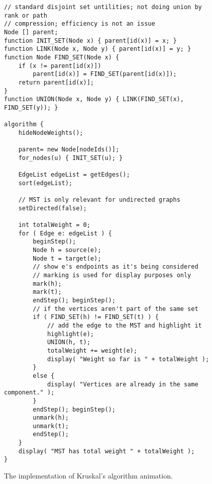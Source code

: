 \begin{figure}

{\small
\begin{verbatim}
// standard disjoint set untilities; not doing union by rank or path
// compression; efficiency is not an issue
Node [] parent;
function INIT_SET(Node x) { parent[id(x)] = x; }
function LINK(Node x, Node y) { parent[id(x)] = y; }
function Node FIND_SET(Node x) {
    if (x != parent[id(x)])
        parent[id(x)] = FIND_SET(parent[id(x)]);
    return parent[id(x)];
}
function UNION(Node x, Node y) { LINK(FIND_SET(x), FIND_SET(y)); }

algorithm {
    hideNodeWeights();

    parent= new Node[nodeIds()];
    for_nodes(u) { INIT_SET(u); }

    EdgeList edgeList = getEdges();
    sort(edgeList);

    // MST is only relevant for undirected graphs
    setDirected(false);

    int totalWeight = 0;
    for ( Edge e: edgeList ) {
        beginStep();
        Node h = source(e);
        Node t = target(e);
        // show e's endpoints as it's being considered
        // marking is used for display purposes only
        mark(h);
        mark(t);
        endStep(); beginStep();
        // if the vertices aren't part of the same set
        if ( FIND_SET(h) != FIND_SET(t) ) {
            // add the edge to the MST and highlight it
            highlight(e);
            UNION(h, t);
            totalWeight += weight(e);
            display( "Weight so far is " + totalWeight );
        }
        else {
            display( "Vertices are already in the same component." );
        }
        endStep(); beginStep();
        unmark(h);
        unmark(t);
        endStep();
    }
    display( "MST has total weight " + totalWeight );
}
\end{verbatim}
} %

\caption{The implementation of Kruskal's algorithm animation.}
\label{fig:kruskals_algorithm}
\end{figure}

